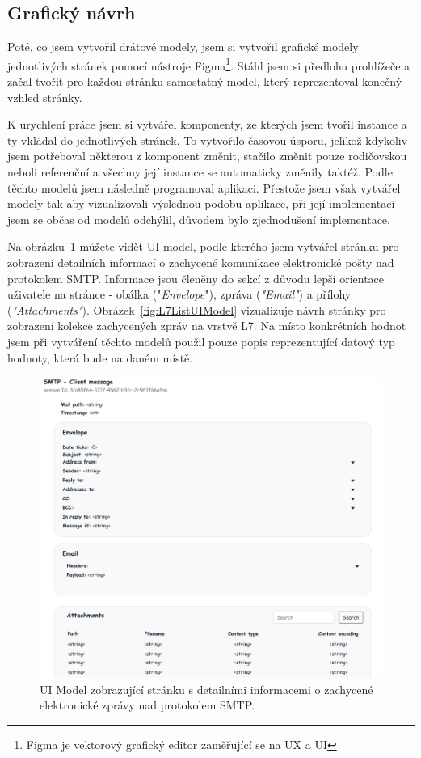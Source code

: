     \subsection{Grafický návrh}
    Poté, co jsem vytvořil drátové modely, jsem si vytvořil grafické modely jednotlivých stránek pomocí nástroje Figma\footnote{Figma je vektorový grafický editor zaměřující se na \gls{UX} a \gls{UI}}. Stáhl jsem si předlohu prohlížeče a začal tvořit pro každou stránku samostatný model, který reprezentoval konečný vzhled stránky. 

    K urychlení práce jsem si vytvářel komponenty, ze kterých jsem tvořil instance a ty vkládal do jednotlivých stránek. To vytvořilo časovou úsporu, jelikož kdykoliv jsem potřeboval některou z komponent změnit, stačilo změnit pouze rodičovskou neboli referenční a všechny její instance se automaticky změnily taktéž. Podle těchto modelů jsem následně programoval aplikaci. Přestože jsem však vytvářel modely tak aby vizualizovali výslednou podobu aplikace, při její implementaci jsem se občas od modelů odchýlil, důvodem bylo zjednodušení implementace.
    
    Na obrázku~\ref{fig:SmtpClientDetail} můžete vidět \gls{UI} model, podle kterého jsem vytvářel stránku pro zobrazení detailních informací o zachycené komunikace elektronické pošty nad protokolem \gls{SMTP}. Informace jsou členěny do sekcí z důvodu lepší orientace uživatele na stránce - obálka ("\textit{Envelope}"), zpráva (\textit{"Email"}) a přílohy (\textit{"Attachments"}). Obrázek~\ref{fig:L7ListUIModel} vizualizuje návrh stránky pro zobrazení kolekce zachycených zpráv na vrstvě L7. Na místo konkrétních hodnot jsem při vytváření těchto modelů použil pouze popis reprezentující datový typ hodnoty, která bude na daném místě.

    \begin{figure}[H]
        \centering
        \includegraphics[scale=0.5]{obrazky-figures/NavrhUXUI/UIModels/SmtpClientDetail.png}
        \caption{\gls{UI} Model zobrazující stránku s detailními informacemi o zachycené elektronické zprávy nad protokolem \gls{SMTP}.}
        \label{fig:SmtpClientDetail}
    \end{figure}

